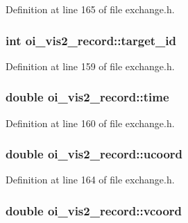 Definition at line 165 of file exchange.h.

\hypertarget{structoi__vis2__record_abf5987df87382c49cbcd70d74917fec2}{
\subsubsection[{target\_\-id}]{\setlength{\rightskip}{0pt plus 5cm}int {\bf oi\_\-vis2\_\-record::target\_\-id}}}
\label{structoi__vis2__record_abf5987df87382c49cbcd70d74917fec2}


Definition at line 159 of file exchange.h.

\hypertarget{structoi__vis2__record_a5e0064a4bcc55dfd0d91e8a1d9fd06b7}{
\subsubsection[{time}]{\setlength{\rightskip}{0pt plus 5cm}double {\bf oi\_\-vis2\_\-record::time}}}
\label{structoi__vis2__record_a5e0064a4bcc55dfd0d91e8a1d9fd06b7}


Definition at line 160 of file exchange.h.

\hypertarget{structoi__vis2__record_a4d7b00239c50fe8e82a84ffa30cb0e3d}{
\subsubsection[{ucoord}]{\setlength{\rightskip}{0pt plus 5cm}double {\bf oi\_\-vis2\_\-record::ucoord}}}
\label{structoi__vis2__record_a4d7b00239c50fe8e82a84ffa30cb0e3d}


Definition at line 164 of file exchange.h.

\hypertarget{structoi__vis2__record_a24770a77f022907a90bd20f58ca0dd50}{
\subsubsection[{vcoord}]{\setlength{\rightskip}{0pt plus 5cm}double {\bf oi\_\-vis2\_\-record::vcoord}}}
\label{structoi__vis2__record_a24770a77f022907a90bd20f58ca0dd50}


